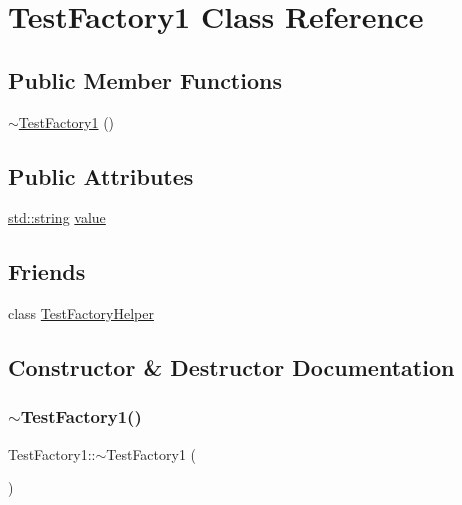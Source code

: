 \hypertarget{class_test_factory1}{}\section{Test\+Factory1 Class Reference}
\label{class_test_factory1}
\subsection*{Public Member Functions}
\begin{DoxyCompactItemize}
\item 
\mbox{\hyperlink{class_test_factory1_ac48d2b49bf787d1d6be6a45b830074e5}{$\sim$\+Test\+Factory1}} ()
\end{DoxyCompactItemize}
\subsection*{Public Attributes}
\begin{DoxyCompactItemize}
\item 
\mbox{\hyperlink{_s_d_l__opengl__glext_8h_ab4ccfaa8ab0e1afaae94dc96ef52dde1}{std\+::string}} \mbox{\hyperlink{class_test_factory1_a0ab70fa599f629a556a98a47f2a6afc1}{value}}
\end{DoxyCompactItemize}
\subsection*{Friends}
\begin{DoxyCompactItemize}
\item 
class \mbox{\hyperlink{class_test_factory1_adc15c60543a15213908f8668bd10792b}{Test\+Factory\+Helper}}
\end{DoxyCompactItemize}


\subsection{Constructor \& Destructor Documentation}
\mbox{\label{class_test_factory1_ac48d2b49bf787d1d6be6a45b830074e5}} 
\subsubsection{\texorpdfstring{$\sim$TestFactory1()}{~TestFactory1()}}
{\footnotesize\ttfamily Test\+Factory1\+::$\sim$\+Test\+Factory1 (\begin{DoxyParamCaption}{ }\end{DoxyParamCaption})\hspace{0.3cm}{\ttfamily [inline]}}



